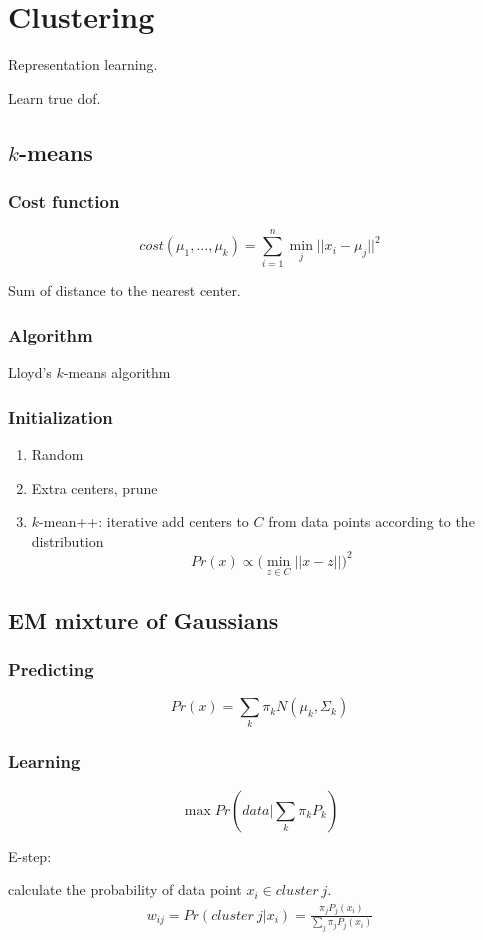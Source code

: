 \documentclass[a4paper]{report}
\begin{document}
\chapter{Clustering}
Representation learning. 

Learn true dof. 

\section{$k$-means}
\subsection{Cost function}
$$
cost(\mu_1, ..., \mu_k) = \sum_{i=1}^n \min_j ||x_i-\mu_j||^2
$$

Sum of distance to the nearest center. 

\subsection{Algorithm}
Lloyd’s $k$-means algorithm

\subsection{Initialization}
\begin{enumerate}
\item Random
\item Extra centers, prune
\item $k$-mean++: iterative add centers to $C$ from data points according to the distribution 
$$
Pr(x) \propto \big(\min_{z\in C}||x-z||\big)^2
$$


\end{enumerate}
\section{EM mixture of Gaussians}
\subsection{Predicting}
$$
Pr(x) = \sum_k \pi_k N(\mu_k, \Sigma_k)
$$

\subsection{Learning}
$$
\max Pr(data|\sum_k \pi_k P_k)
$$

E-step:

calculate the probability of data point $x_i \in cluster~j$. 
\begin{align*}
w_{ij} = Pr(cluster~j|x_i) = \frac{\pi_j P_j(x_i)}{\sum_j \pi_j P_j(x_i)}
\end{align*}
\end{document}
